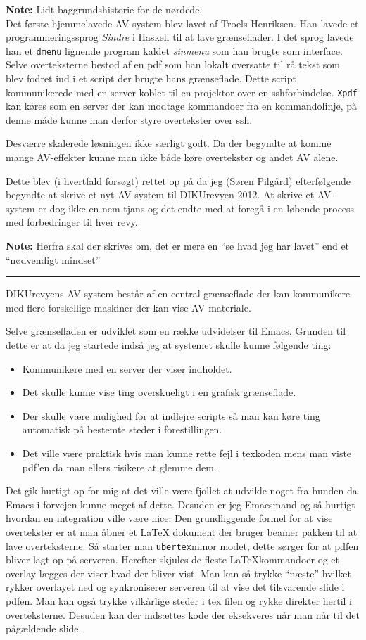 \documentclass[10pt,a4paper,danish]{article}
\newcommand{\note}[1]{\begin{mdframed}[style=note]\textbf{Note:}
    #1\end{mdframed}}
\begin{document}
\note{Lidt baggrundshistorie for de nørdede.\\
  Det første hjemmelavede AV-system blev lavet af Troels Henriksen.
  Han lavede et programmeringssprog \textit{Sindre} i Haskell til at lave
  grænseflader.  I det sprog lavede han et \texttt{dmenu} lignende program
  kaldet \textit{sinmenu} som han brugte som interface. Selve overteksterne
  bestod af en pdf som han lokalt oversatte til rå tekst som blev fodret ind i
  et script der brugte hans grænseflade. Dette script kommunikerede med en
  server koblet til en projektor over en sshforbindelse.  \texttt{Xpdf} kan
  køres som en server der kan modtage kommandoer fra en kommandolinje, på denne
  måde kunne man derfor styre overtekster over ssh.

  Desværre skalerede løsningen ikke særligt godt. Da der begyndte at komme mange
  AV-effekter kunne man ikke både køre overtekster og andet AV alene.

  Dette blev (i hvertfald forsøgt) rettet op på da jeg (Søren Pilgård) efterfølgende begyndte at skrive et nyt
  AV-system til DIKUrevyen 2012.
  At skrive et AV-system er dog ikke en nem tjans og det endte med at foregå i en
  løbende process med forbedringer til hver revy.
}
\newpage
\note{Herfra skal der skrives om, det er mere en ``se hvad jeg har lavet'' end et
  ``nødvendigt mindset''
  \hrule
}
DIKUrevyens AV-system består af en central grænseflade der kan kommunikere med flere
forskellige maskiner der kan vise AV materiale.

Selve grænsefladen er udviklet som en række udvidelser til Emacs.
Grunden til dette er at da jeg startede indså jeg at systemet skulle kunne
følgende ting:
\begin{itemize}
\item Kommunikere med en server der viser indholdet.
\item Det skulle kunne vise ting overskueligt i en grafisk grænseflade.
\item Der skulle være mulighed for at indlejre scripts så man kan køre ting
  automatisk på bestemte steder i forestillingen.
\item Det ville være praktisk hvis man kunne rette fejl i texkoden mens man
  viste pdf'en da man ellers risikere at glemme dem.
\end{itemize}

Det gik hurtigt op for mig at det ville være fjollet at udvikle noget fra bunden
da Emacs i forvejen kunne meget af dette. Desuden er jeg Emacsmand og så hurtigt
hvordan en integration ville være nice.
Den grundliggende formel for at vise overtekster er at man åbner et LaTeX
dokument der bruger beamer pakken til at lave overteksterne. Så starter man
\texttt{ubertex}minor modet, dette sørger for at pdfen bliver lagt op på
serveren. Herefter skjules de fleste LaTeXkommandoer og et overlay lægges der
viser hvad der bliver vist. Man kan så trykke ``næste'' hvilket rykker overlayet ned
og synkroniserer serveren til at vise det tilsvarende slide i pdfen.
Man kan også trykke vilkårlige steder i tex filen og rykke direkter hertil i
overteksterne. Desuden kan der indsættes kode der eksekveres når man når til det
pågældende slide.
\end{document}
